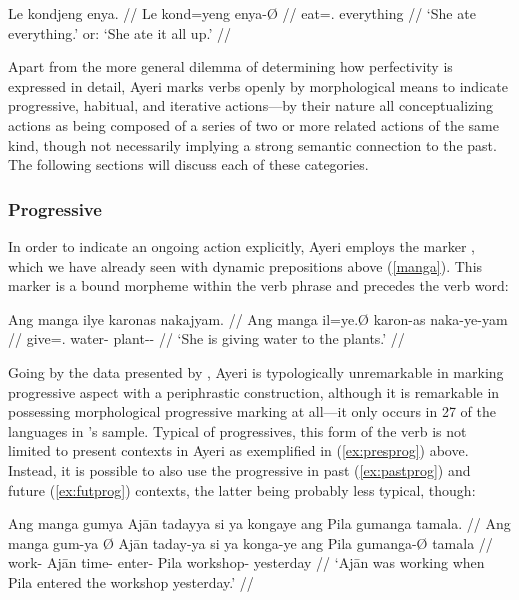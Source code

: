 \ex\begingl
	\gla Le kondjeng enya. //
	\glb Le kond=yeng enya-Ø //
	\glc \PatTI{} eat=\TsgF{}.\Aarg{} everything //
	\glft `She ate everything.' or: `She ate it all up.' //
\endgl\xe

Apart from the more general dilemma of determining how perfectivity is
expressed in detail, Ayeri marks verbs openly by morphological means to
indicate progressive, habitual, and iterative actions---by their nature all
conceptualizing actions as being composed of a series of two or more related
actions of the same kind, though not necessarily implying a strong semantic
connection to the past. The following sections will discuss each of these
categories.

\subsubsection{Progressive}

In order to indicate an ongoing action explicitly, Ayeri employs the marker 
, which we have already seen with dynamic prepositions above 
(\autoref{manga}). This marker is a bound morpheme within the verb phrase and 
precedes the verb word:

\ex\label{ex:presprog}\begingl
	\gla Ang manga ilye karonas nakajyam. //
	\glb Ang manga il=ye.Ø karon-as naka-ye-yam //
	\glc \AgtT{} \Prog{} give=\TsgF{}.\Top{} water-\Parg{} 
		plant-\Pl{}-\Dat{} //
	\glft `She is giving water to the plants.' //
\endgl\xe

Going by the data presented by \citet[91]{dahl1985}, Ayeri is typologically
unremarkable in marking progressive aspect with a periphrastic construction,
although it is remarkable in possessing morphological progressive marking at
all---it only occurs in 27\pct{} of the languages in \citeauthor{dahl1985}'s
sample. Typical of progressives, this form of the verb is not limited to
present contexts in Ayeri as exemplified in (\ref{ex:presprog}) above. Instead,
it is possible to also use the progressive in past (\ref{ex:pastprog}) and
future (\ref{ex:futprog}) contexts, the latter being probably less typical,
though:

\pex\label{ex:nonpresprog}
\a\label{ex:pastprog}\begingl
	\gla Ang manga gumya {} Ajān tadayya si ya kongaye ang Pila gumanga 
		tamala. //
	\glb Ang manga gum-ya Ø Ajān taday-ya si ya konga-ye ang Pila 
		gumanga-Ø tamala //
	\glc \AgtT{} \Prog{} work-\Tsg{} \Top{} Ajān time-\Loc{} \Rel{} \LocT{} 
		enter-\TsgF{} \Aarg{} Pila workshop-\Top{} yesterday //
	\glft `Ajān was working when Pila entered the workshop yesterday.' //
\endgl

